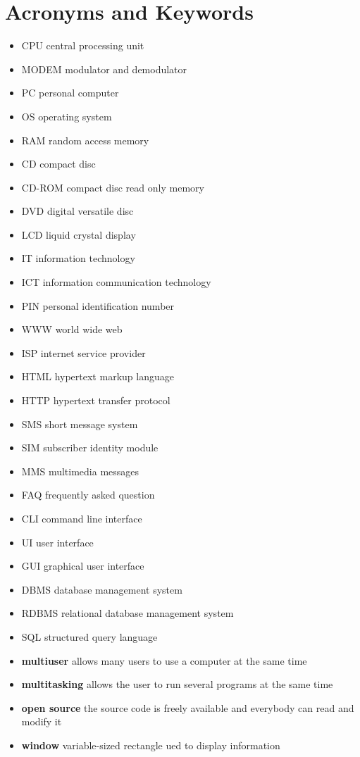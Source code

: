 \documentclass[a4paper,8pt]{article}
\begin{document}
\section{Acronyms and Keywords}
\begin{itemize}
\item CPU central processing unit
\item MODEM modulator and demodulator
\item PC personal computer
\item OS operating system
\item RAM random access memory
\item CD compact disc
\item CD-ROM compact disc read only memory
\item DVD digital versatile disc
\item LCD liquid crystal display
\item IT information technology
\item ICT information communication technology
\item PIN personal identification number
\item WWW world wide web
\item ISP internet service provider
\item HTML hypertext markup language
\item HTTP hypertext transfer protocol
\item SMS short message system
\item SIM subscriber identity module
\item MMS multimedia messages
\item FAQ frequently asked question
\item CLI command line interface
\item UI user interface
\item GUI graphical user interface
\item DBMS database management system
\item RDBMS relational database management system
\item SQL structured query language
\item \textbf{multiuser} allows many users to use a computer at the same time 
\item \textbf{multitasking} allows the user to run several programs at the 
same time
\item \textbf{open source} the source code is freely available and everybody
can read and modify it
\item \textbf{window} variable-sized rectangle ued to display information

\end{itemize}
\end{document}
